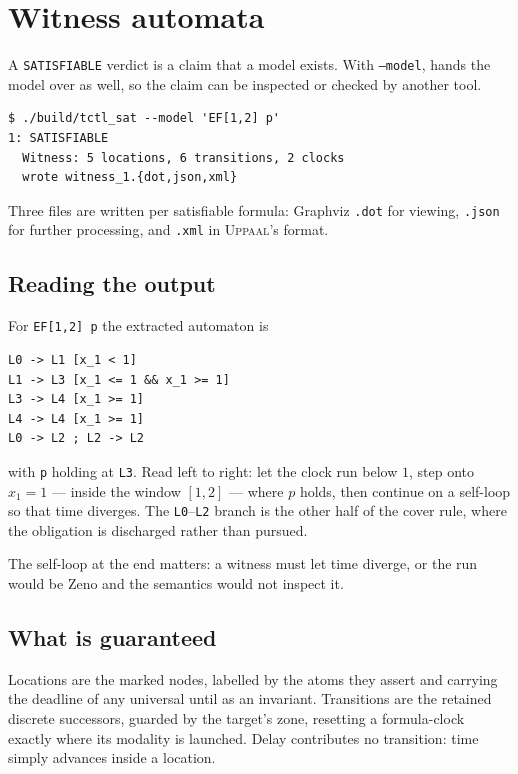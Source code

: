 \section{Witness automata}\label{sec:witness}

A \texttt{SATISFIABLE} verdict is a claim that a model exists.  With
\texttt{--model}, \tool hands the model over as well, so the claim can be
inspected or checked by another tool.

\begin{lstlisting}
$ ./build/tctl_sat --model 'EF[1,2] p'
1: SATISFIABLE
  Witness: 5 locations, 6 transitions, 2 clocks
  wrote witness_1.{dot,json,xml}
\end{lstlisting}

\noindent
Three files are written per satisfiable formula: Graphviz \texttt{.dot} for
viewing, \texttt{.json} for further processing, and \texttt{.xml} in
\textsc{Uppaal}'s format.

\subsection{Reading the output}

For \texttt{EF[1,2] p} the extracted automaton is

\begin{lstlisting}
L0 -> L1 [x_1 < 1]
L1 -> L3 [x_1 <= 1 && x_1 >= 1]
L3 -> L4 [x_1 >= 1]
L4 -> L4 [x_1 >= 1]
L0 -> L2 ; L2 -> L2
\end{lstlisting}

\noindent
with \texttt{p} holding at \texttt{L3}.  Read left to right: let the clock run
below $1$, step onto $x_1 = 1$ --- inside the window $[1,2]$ --- where $p$
holds, then continue on a self-loop so that time diverges.  The
\texttt{L0}--\texttt{L2} branch is the other half of the cover rule, where the
obligation is discharged rather than pursued.

The self-loop at the end matters: a witness must let time diverge, or the
run would be Zeno and the semantics would not inspect it.

\subsection{What is guaranteed}

Locations are the marked nodes, labelled by the atoms they assert and carrying
the deadline of any universal until as an invariant.  Transitions are the
retained discrete successors, guarded by the target's zone, resetting a
formula-clock exactly where its modality is launched.  Delay contributes no
transition: time simply advances inside a location.

